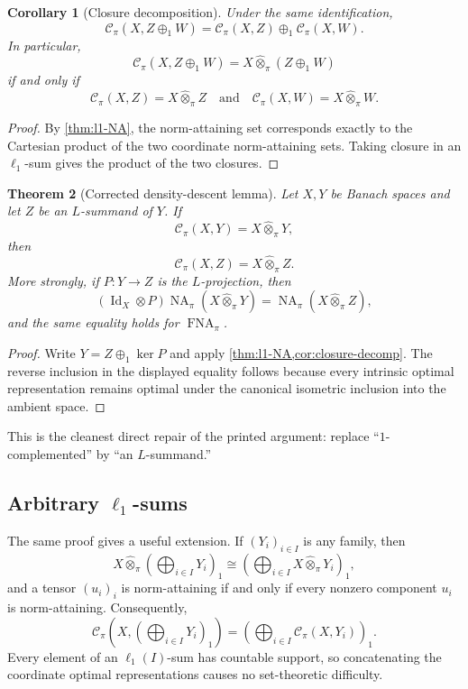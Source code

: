 \documentclass[11pt]{article}
\newtheorem{theorem}{Theorem}[section]
\newtheorem{corollary}[theorem]{Corollary}
\theoremstyle{definition}
\theoremstyle{remark}
\newcommand{\whot}{\widehat\otimes_\pi}
\newcommand{\NA}{\operatorname{NA}_\pi}
\newcommand{\FNA}{\operatorname{FNA}_\pi}
\newcommand{\Id}{\operatorname{Id}}
\newcommand{\Cpi}{\mathscr C_\pi}
\begin{document}
\begin{corollary}[Closure decomposition]\label{cor:closure-decomp}
Under the same identification,
\[
 \Cpi(X,Z\oplus_1W)
 =\Cpi(X,Z)\oplus_1\Cpi(X,W).
\]
In particular,
\[
 \Cpi(X,Z\oplus_1W)=X\whot(Z\oplus_1W)
\]
if and only if
\[
 \Cpi(X,Z)=X\whot Z
 \quad\text{and}\quad
 \Cpi(X,W)=X\whot W.
\]
\end{corollary}

\begin{proof}
By \cref{thm:l1-NA}, the norm-attaining set corresponds exactly to the Cartesian product of the two coordinate norm-attaining sets.  Taking closure in an $\ell_1$-sum gives the product of the two closures.
\end{proof}

\begin{theorem}[Corrected density-descent lemma]\label{thm:corrected-lemma}
Let $X,Y$ be Banach spaces and let $Z$ be an $L$-summand of $Y$.  If
\[
 \Cpi(X,Y)=X\whot Y,
\]
then
\[
 \Cpi(X,Z)=X\whot Z.
\]
More strongly, if $P:Y\to Z$ is the $L$-projection, then
\[
 (\Id_X\otimes P)
 \NA(X\whot Y)
 =\NA(X\whot Z),
\]
and the same equality holds for $\FNA$.
\end{theorem}

\begin{proof}
Write $Y=Z\oplus_1\ker P$ and apply \cref{thm:l1-NA,cor:closure-decomp}.  The reverse inclusion in the displayed equality follows because every intrinsic optimal representation remains optimal under the canonical isometric inclusion into the ambient space.
\end{proof}

This is the cleanest direct repair of the printed argument: replace ``$1$-complemented'' by ``an $L$-summand.''

\subsection{Arbitrary $\ell_1$-sums}

The same proof gives a useful extension.  If $(Y_i)_{i\in I}$ is any family, then
\[
 X\whot\left(\bigoplus_{i\in I}Y_i\right)_1
 \cong
 \left(\bigoplus_{i\in I}X\whot Y_i\right)_1,
\]
and a tensor $(u_i)_i$ is norm-attaining if and only if every nonzero component $u_i$ is norm-attaining.  Consequently,
\[
 \Cpi\left(X,\left(\bigoplus_{i\in I}Y_i\right)_1\right)
 =
 \left(\bigoplus_{i\in I}\Cpi(X,Y_i)\right)_1.
\]
Every element of an $\ell_1(I)$-sum has countable support, so concatenating the coordinate optimal representations causes no set-theoretic difficulty.
\end{document}
